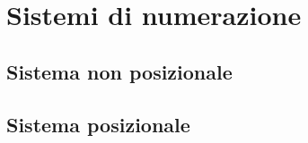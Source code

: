 \chapter{Sistemi di numerazione}
\label{cha:Sistemi di numerazione}
\minitoc
\mtcskip                                %
\minilof                                %
\mtcskip                                %
\minilot
\section{Sistema non posizionale}
\label{sec:sistemanonposizionale}
\section{Sistema posizionale}
\label{sec:sistemaposizionale}